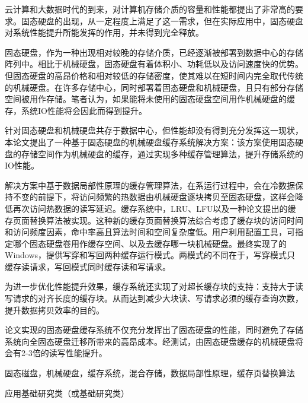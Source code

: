 
\begin{cabstract}

云计算和大数据时代的到来，对计算机存储介质的容量和性能都提出了非常高的要求。固态硬盘的出现，从一定程度上满足了这一需求，但在实际应用中，固态硬盘对系统性能提升所能发挥的作用，并未得到完全释放。

固态硬盘，作为一种出现相对较晚的存储介质，已经逐渐被部署到数据中心的存储阵列中。相比于机械硬盘，固态硬盘有着体积小、功耗低以及访问速度快的优势。但固态硬盘的高昂价格和相对较低的存储密度，使其难以在短时间内完全取代传统的机械硬盘。在许多存储中心，同时部署着固态硬盘和机械硬盘，且只有部分存储空间被用作存储。笔者认为，如果能将未使用的固态硬盘空间用作机械硬盘的缓存，系统IO性能将会因此而得到提升。

针对固态硬盘和机械硬盘共存于数据中心，但性能却没有得到充分发挥这一现状，本论文提出了一种基于固态硬盘的机械硬盘缓存系统解决方案：该方案使用固态硬盘的存储空间作为机械硬盘的缓存，通过实现多种缓存管理算法，提升存储系统的IO性能。

解决方案中基于数据局部性原理的缓存管理算法，在系运行过程中，会在冷数据保持不变的前提下，将访问频繁的热数据由机械硬盘逐块拷贝至固态硬盘，这样会降低再次访问热数据的读写延迟。缓存系统中，LRU、LFU以及一种论文提出的缓存页面替换算法被实现。这种新的缓存页面替换算法综合考虑了缓存块的访问时间和访问频度因素，命中率高且算法时间和空间复杂度低。用户利用配置工具，可指定哪个固态硬盘卷用作缓存空间、以及去缓存哪一块机械硬盘。最终实现了的Windows，提供写穿和写回两种缓存运行模式。两模式的不同在于，写穿模式只缓存读请求，写回模式同时缓存读和写请求。

为进一步优化性能提升效果，缓存系统还实现了对超长缓存块的支持：支持大于读写请求的对齐长度的缓存块。从而达到减少大块读、写请求必须的缓存查询次数，提升数据拷贝效率的目的。

论文实现的固态硬盘缓存系统不仅充分发挥出了固态硬盘的性能，同时避免了存储系统向全固态硬盘迁移所带来的高昂成本。经测试，由固态硬盘缓存的机械硬盘将会有2-3倍的读写性能提升。

\end{cabstract}

\begin{ckeywords}
固态磁盘，机械硬盘，缓存系统，混合存储，数据局部性原理，缓存页替换算法
\end{ckeywords}

\begin{cthesistype}
应用基础研究类（或基础研究类）
\end{cthesistype}

